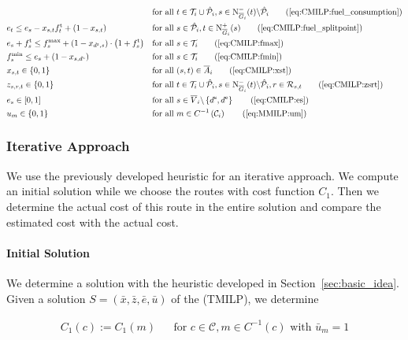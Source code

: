 \begin{align}
	& & & \text{for all } t\in\Ti\cup\Phat_i, s\in\Ninoi(t)\backslash\Phat_i \tag{\ref{eq:CMILP:fuel_consumption}} \\
	& e_t \leq e_s-x_{s,t}\ft_t+\left(1-x_{s,t}\right) && \text{for all } s\in\Phat_i,t\in\Noutoi(s) \tag{\ref{eq:CMILP:fuel_splitpoint}} \\
	& e_s + \ft_s \leq f^{\max}_s + \left(1-x_{\ds,s}\right)\cdot\left(1+\ft_s\right) && \text{for all } s\in\Ti \tag{\ref{eq:CMILP:fmax}} \\
	& f^{\min}_s \leq e_s + \left(1-x_{s,\de}\right) && \text{for all } s\in\Ti \tag{\ref{eq:CMILP:fmin}} \\
	& x_{s,t}\in\{0,1\} & & \text{for all } (s,t)\in\overline{A}_i \tag{\ref{eq:CMILP:xst}} \\
	& z_{s,r,t}\in\{0,1\} & & \text{for all } t\in\Ti\cup\Phat_i,s\in\Ninoi(t)\backslash\Phat_i,r\in\Rst \tag{\ref{eq:CMILP:zsrt}} \\
	& e_s\in[0,1] & & \text{for all } s\in\overline{V}_i\backslash\left\{\ds,\de\right\} \tag{\ref{eq:CMILP:es}} \\
	& u_m\in\{0,1\} && \text{for all } m\in C^{-1}\left(\mathcal{C}_i\right) \tag{\ref{eq:MMILP:um}}
\end{align}

\pagestyle{headings}


\subsubsection{Iterative Approach}
\label{sec:iterative_approach}

We use the previously developed heuristic for an iterative approach. We compute an initial solution while we choose the routes with cost function $C_1$. Then we determine the actual cost of this route in the entire solution and compare the estimated cost with the actual cost.

\paragraph{Initial Solution} \parfill

We determine a solution with the heuristic developed in Section~\ref{sec:basic_idea}. Given a solution $S=\left(\bar{x},\bar{z},\bar{e},\bar{u}\right)$ of the (TMILP), we determine 

\begin{align*}
	C_1(c) := C_1(m) && \text{for } c\in\mathcal{C}, m\in C^{-1}(c) \text{ with } \bar{u}_m = 1
\end{align*}

